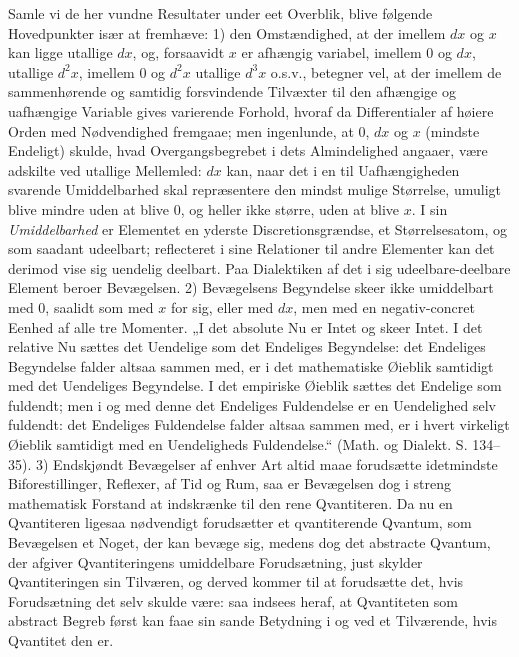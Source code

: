 \documentclass[12pt,a4paper]{book}
\begin{document}
Samle vi de her vundne Resultater under eet Overblik,
blive følgende Hovedpunkter især at fremhæve: 1) den
Omstændighed, at der imellem $dx$ og $x$ kan ligge utallige $dx$,
og, forsaavidt $x$ er afhængig variabel, imellem $0$ og $dx$,
utallige $d^2x$, imellem $0$ og $d^2x$ utallige $d^3x$ o.s.v.,
betegner vel, at der imellem de sammenhørende og samtidig
forsvindende Tilvæxter til den afhængige og uafhængige Variable
gives varierende Forhold, hvoraf da Differentialer af høiere
Orden med Nødvendighed fremgaae; men ingenlunde, at $0$,
$dx$ og $x$ (mindste Endeligt) skulde, hvad Overgangsbegrebet
i dets Almindelighed angaaer, være adskilte ved utallige
Mellemled: $dx$ kan, naar det i en til Uafhængigheden svarende
Umiddelbarhed skal repræsentere den mindst mulige Størrelse,
umuligt blive mindre uden at blive $0$, og heller ikke større,
uden at blive $x$. I sin \emph{Umiddelbarhed} er Elementet en
yderste Discretionsgrændse, et Størrelsesatom, og som saadant
udeelbart; reflecteret i sine Relationer til andre Elementer kan
det derimod vise sig uendelig deelbart. Paa Dialektiken af det
i sig udeelbare-deelbare Element beroer Bevægelsen. 2) Bevægelsens
Begyndelse skeer ikke umiddelbart med $0$, saalidt som med $x$
for sig, eller med $dx$, men med en negativ-concret Eenhed af
alle tre Momenter. „I det absolute Nu er Intet og skeer
Intet. I det relative Nu sættes det Uendelige som det Endeliges
Begyndelse: det Endeliges Begyndelse falder altsaa
sammen med, er i det mathematiske Øieblik samtidigt med
det Uendeliges Begyndelse. I det empiriske Øieblik sættes
det Endelige som fuldendt; men i og med denne det Endeliges
Fuldendelse er en Uendelighed selv fuldendt: det Endeliges
Fuldendelse falder altsaa sammen med, er i hvert virkeligt
Øieblik samtidigt med en Uendeligheds Fuldendelse.“ (Math. og
Dialekt. S. 134--35). 3) Endskjøndt Bevægelser af enhver
Art altid maae forudsætte idetmindste Biforestillinger, Reflexer,
af Tid og Rum, saa er Bevægelsen dog i streng mathematisk
Forstand at indskrænke til den rene Qvantiteren. Da nu en
Qvantiteren ligesaa nødvendigt forudsætter et qvantiterende
Qvantum, som Bevægelsen et Noget, der kan bevæge sig,
medens dog det abstracte Qvantum, der afgiver Qvantiteringens
umiddelbare Forudsætning, just skylder Qvantiteringen
sin Tilværen, og derved kommer til at forudsætte det, hvis
Forudsætning det selv skulde være: saa indsees heraf, at Qvantiteten
som abstract Begreb først kan faae sin sande Betydning
i og ved et Tilværende, hvis Qvantitet den er.
\end{document}
